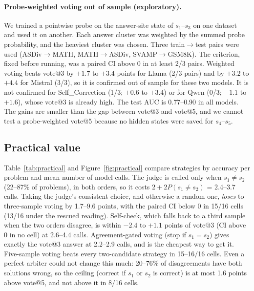 \documentclass[11pt]{article}
\begin{document}
\paragraph{Probe-weighted voting out of sample (exploratory).} We trained a pointwise probe on the
answer-site state of $s_1$--$s_3$ on one dataset and used it on another. Each answer cluster was weighted by the
summed probe probability, and the heaviest cluster was chosen. Three train$\to$test pairs were used
(ASDiv$\to$MATH, MATH$\to$ASDiv, SVAMP$\to$GSM8K). The criterion, fixed before running, was a paired CI above
0 in at least 2/3 pairs. Weighted voting beats vote@3 by $+1.7$ to $+3.4$ points for Llama (2/3 pairs) and by
$+3.2$ to $+4.4$ for Mistral (3/3), so it is confirmed out of sample for these two models. It is not confirmed
for Self\_Correction (1/3; $+0.6$ to $+3.4$) or for Qwen (0/3; $-1.1$ to $+1.6$), whose vote@3 is already
high. The test AUC is 0.77--0.90 in all models. The gains are smaller than the gap between vote@3 and
vote@5, and we cannot test a probe-weighted vote@5 because no hidden states were saved for $s_4$--$s_5$.

\subsection{Practical value}
Table~\ref{tab:practical} and Figure~\ref{fig:practical} compare strategies by accuracy per problem and
mean number of model calls. The judge is called only when $s_1\neq s_2$ (22--87\% of problems), in both orders,
so it costs $2+2P(s_1\neq s_2)$ = 2.4--3.7 calls. Taking the judge's consistent choice, and otherwise a random
one, \emph{loses} to three-sample voting by 1.7--9.6 points, with the paired CI below 0 in 15/16 cells (13/16
under the rescued reading). Self-check, which falls back to a third sample when the two orders disagree, is
within $-2.4$ to $+1.1$ points of vote@3 (CI above 0 in no cell) at 2.6--4.4 calls. Agreement-gated voting
(stop if $s_1=s_2$) gives exactly the vote@3 answer at 2.2--2.9 calls, and is the cheapest way to get it.
Five-sample voting beats every two-candidate strategy in 15--16/16 cells. Even a perfect arbiter could not
change this much: 20--76\% of disagreements have both solutions wrong, so the ceiling (correct if $s_1$ or
$s_2$ is correct) is at most 1.6 points above vote@5, and not above it in 8/16 cells.

\begin{table}[t]
\centering\small
\caption{Accuracy (\%) per problem, project parser. Judge = consistent choice over both orders, otherwise
random; self-check = otherwise vote@3. Ceiling = $s_1$ or $s_2$ correct. Paired bootstrap CI. Exploratory.}
\label{tab:practical}

\end{table}
\end{document}
